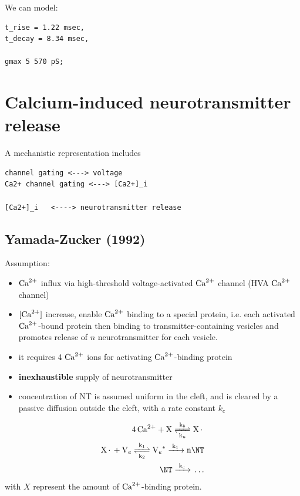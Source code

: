We can model:
\begin{verbatim}
t_rise = 1.22 msec, 
t_decay = 8.34 msec, 

gmax 5 570 pS;
\end{verbatim}


\section{Calcium-induced neurotransmitter release}

A mechanistic representation includes
\begin{verbatim}
channel gating <---> voltage
Ca2+ channel gating <---> [Ca2+]_i

[Ca2+]_i   <----> neurotransmitter release           
\end{verbatim}

\subsection{Yamada-Zucker (1992)}
\label{sec:Yamada-Zucker-1992}

Assumption:
\begin{itemize}
  \item ${\text{Ca}^{2+}}$ influx via high-threshold voltage-activated ${\text{Ca}^{2+}}$ channel (HVA
  ${\text{Ca}^{2+}}$ channel)
  
  \item $[{\text{Ca}^{2+}}]$ increase, enable ${\text{Ca}^{2+}}$ binding to a special protein, i.e.
  each activated ${\text{Ca}^{2+}}$-bound protein then binding to transmitter-containing
  vesicles and promotes release of $n$ neurotransmitter for each vesicle.
  
  \item it requires 4 ${\text{Ca}^{2+}}$ ions for activating ${\text{Ca}^{2+}}$-binding protein
  
  \item {\bf inexhaustible} supply of neurotransmitter
  
  \item concentration of NT is assumed uniform in the cleft, and is cleared by a
  passive diffusion outside the cleft, with a rate constant $k_c$
\end{itemize}

\begin{equation}
\begin{split}
\ce{4Ca^2+ + X <=>[k_b][k_u] X*} \\
\ce{X* + V_e <=>[k_1][k_2]  V_e^* ->[k_1] n }\NT \\
\NT \ce{->[k_c]} \ldots
\end{split}
\end{equation}
with $X$ represent the amount of ${\text{Ca}^{2+}}$-binding protein.

